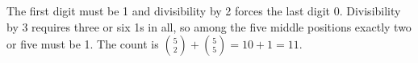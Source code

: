 The first digit must be 1 and divisibility by 2 forces the last digit 0. Divisibility by 3 requires three or six 1s in all, so among the five middle positions exactly two or five must be 1. The count is $\binom52+\binom55=10+1=\boxed{11}$.
